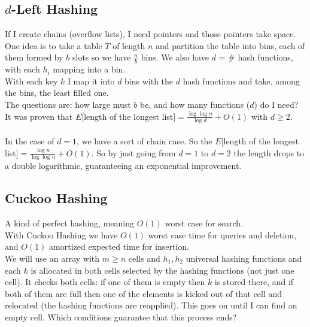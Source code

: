 \documentclass[10pt]{report}
\begin{document}
\subsection{$d$-Left Hashing}
If I create chains (overflow lists), I need pointers and those pointers take space. One idea is to take a table $T$ of length $n$ and partition the table into bins, each of them formed by $b$ slots so we have $\frac{n}{b}$ bins.  We also have $d$ = \# hash functions, with each $h_i$ mapping into a bin.\\
With each key $k$ I map it into $d$ bins with the $d$ hash functions and take, among the bins, the least filled one.\\
The questions are: how large must $b$ be, and how many functions ($d$) do I need?\\
It was proven that $E[$length of the longest list$]= \frac{\log\log n}{\log d} + O(1)$ with $d\geq 2$.\\\\
In the case of $d=1$, we have a sort of chain case. So the $E[$length of the longest list$]= \frac{\log n}{\log\log n} + O(1)$. So by just going from $d=1$ to $d=2$ the length drops to a double logarithmic, guaranteeing an exponential improvement.
\subsection{Cuckoo Hashing}
A kind of perfect hashing, meaning $O(1)$ worst case for search.\\
With Cuckoo Hashing we have $O(1)$ worst case time for queries and deletion, and $O(1)$  amortized expected time for insertion.\\
We will use an array with $m\geq n$ cells and $h_1,h_2$ universal hashing functions and each $k$ is allocated in both cells selected by the hashing functions (not just one cell). It checks both cells: if one of them is empty then $k$ is stored there, and if both of them are full then one of the elements is kicked out of that cell and relocated (the hashing functions are reapplied). This goes on until I can find an empty cell. Which conditions guarantee that this process ends?
\end{document}
